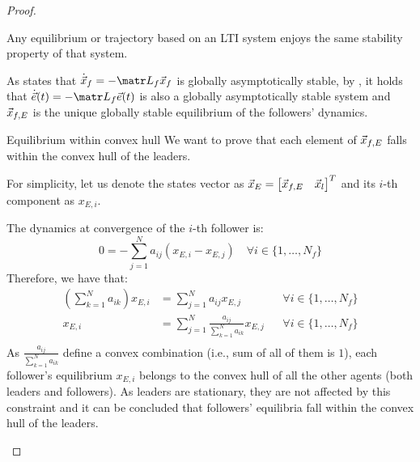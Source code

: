 \begin{theorem}
\begin{proof}
\begin{descriptionlist}
                \begin{lemma} \label{th:lti_stability_equilib_traj}
                    Any equilibrium or trajectory based on an LTI system enjoys the same stability property of that system.
                \end{lemma}

                As  states that $\dot{\x}_f = -\lap_f \x_f$ is globally asymptotically stable, by , it holds that $\dot{\vec{e}}(t) = -\lap_f \vec{e}(t)$ is also a globally asymptotically stable system and ${\vec{x}}_{f,E}$ is the unique globally stable equilibrium of the followers' dynamics.

            \item[Equilibrium within convex hull] 
                We want to prove that each element of ${\vec{x}}_{f,E}$ falls within the convex hull of the leaders.

                For simplicity, let us denote the states vector as ${\vec{x}}_E = \begin{bmatrix} {\vec{x}}_{f,E} & {\vec{x}}_l \end{bmatrix}^T$ and its $i$-th component as $x_{E,i}$.

                The dynamics at convergence of the $i$-th follower is:
                \[ 0 = - \sum_{j=1}^N a_{ij} (x_{E,i} - x_{E,j}) \quad \forall i \in \{ 1, \dots, N_f \} \]
                Therefore, we have that:
                \[
                    \begin{aligned}
                        \left( \sum_{k=1}^N a_{ik} \right) x_{E,i} &= \sum_{j=1}^N a_{ij} x_{E,j} & & \forall i \in \{ 1, \dots, N_f \} \\
                        x_{E,i} &= \sum_{j=1}^N \frac{a_{ij}}{\sum_{k=1}^N a_{ik}} x_{E,j} & & \forall i \in \{ 1, \dots, N_f \} \\
                    \end{aligned}
                \]
                As $\frac{a_{ij}}{\sum_{k=1}^N a_{ik}}$ define a convex combination (i.e., sum of all of them is $1$), each follower's equilibrium $x_{E,i}$ belongs to the convex hull of all the other agents (both leaders and followers). As leaders are stationary, they are not affected by this constraint and it can be concluded that followers' equilibria fall within the convex hull of the leaders.
        \end{descriptionlist}
    \end{proof}
\end{theorem}

